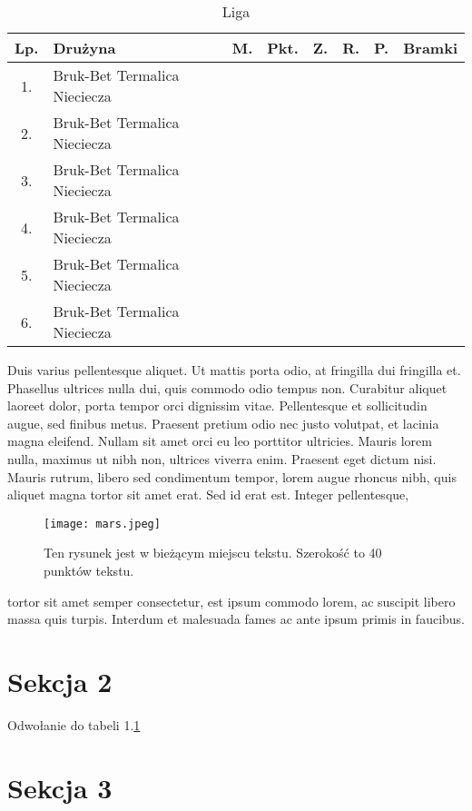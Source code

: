 \documentclass[11pt,a4paper]{article}  %
\begin{document}
\begin{table}[]
\centering
\label{tab:tabela}

\begin{tabular}{|c|l|c|c|c|c|c|c|}
\hline
Lp. & Drużyna & M. & Pkt. & Z. & R. & P. & Bramki \\ \hline
1.  & Bruk-Bet Termalica Nieciecza        &    &      &    &    &    &        \\ \hline
2.  & Bruk-Bet Termalica Nieciecza        &    &      &    &    &    &        \\ \hline
3.  & Bruk-Bet Termalica Nieciecza       &    &      &    &    &    &        \\ \hline
4.  & Bruk-Bet Termalica Nieciecza        &    &      &    &    &    &        \\ \hline
5.  & Bruk-Bet Termalica Nieciecza        &    &      &    &    &    &        \\ \hline
6.  & Bruk-Bet Termalica Nieciecza       &    &      &    &    &    &        \\ \hline

\end{tabular}
\caption{Liga}
\end{table}

Duis varius pellentesque aliquet. Ut mattis porta odio, at fringilla dui fringilla et. Phasellus ultrices nulla dui, quis commodo odio tempus non. Curabitur aliquet laoreet dolor, porta tempor orci dignissim vitae. Pellentesque et sollicitudin augue, sed finibus metus. Praesent pretium odio nec justo volutpat, et lacinia magna eleifend. Nullam sit amet orci eu leo porttitor ultricies. Mauris lorem nulla, maximus ut nibh non, ultrices viverra enim. Praesent eget dictum nisi. Mauris rutrum, libero sed condimentum tempor, lorem augue rhoncus nibh, quis aliquet magna tortor sit amet erat. Sed id erat est. Integer pellentesque,
\begin{figure}[ht]
\centering
        \texttt{[image: mars.jpeg]}
        \caption{ Ten rysunek jest w bieżącym miejscu tekstu. Szerokość to 40 punktów tekstu.}
\end{figure}
tortor sit amet semper consectetur, est ipsum commodo lorem, ac suscipit libero massa quis turpis. Interdum et malesuada fames ac ante ipsum primis in faucibus.
\section{Sekcja 2}
Odwołanie do tabeli 1.\ref{tab:tabela}
\section{Sekcja 3}
\end{document}
